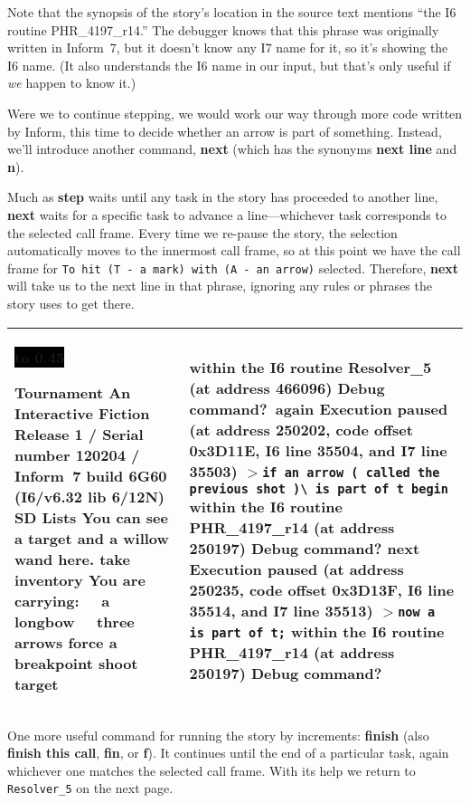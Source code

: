 \documentclass{book}
\newcommand{\n}{\hspace*{\fill}\newline}
\newcommand{\terp}[2]{\begin{center}\begin{tabular}{p{0.45\textwidth}|p{0.45\textwidth}}\midrule #1&#2\\\midrule\end{tabular}\end{center}}
\newcommand{\glkheading}[1]{\textbf{#1}}
\newcommand{\glkinput}[1]{\textbf{#1}}
\newcommand{\glkstatusline}[2]{\centerline{\colorbox{black}{\hbox to 0.45\textwidth{\textcolor{white}{#1\hfil #2}}}}}
\newcommand{\storyprompt}{\raisebox{1.5pt}{\(>\)}}
\newcommand{\cursor}{\raisebox{-1.5pt}{\RectangleThin}}
\newcommand{\markedindent}{\(>\)\qquad}
\begin{document}
Note that the synopsis of the story's location in the source text mentions ``the
I6 routine PHR\_4197\_r14.''  The debugger knows that this phrase was originally
written in Inform~7, but it doesn't know any I7 name for it, so it's showing the
I6 name.  (It also understands the I6 name in our input, but that's only useful
if \emph{we} happen to know it.)

Were we to continue stepping, we would work our way through more code written by
Inform, this time to decide whether an arrow is part of something.  Instead,
we'll introduce another command, \glkinput{next} (which has the synonyms
\glkinput{next line} and \glkinput{n}).

Much as \glkinput{step} waits until any task in the story has proceeded to
another line, \glkinput{next} waits for a specific task to advance a
line---whichever task corresponds to the selected call frame.  Every time we
re-pause the story, the selection automatically moves to the innermost call
frame, so at this point we have the call frame for
\lstinline{To hit (T - a mark)}\lstinline{ with (A - an arrow)} selected.
Therefore, \glkinput{next} will take us to the next line in that phrase,
ignoring any rules or phrases the story uses to get there.

\terp{\glkstatusline{Lists}{0/2}\n
  \glkheading{Tournament}\n
  An Interactive Fiction\n
  Release 1 / Serial number 120204 / Inform~7 build 6G60 (I6/v6.32 lib 6/12N) SD\n
  \n
  \glkheading{Lists}\n
  You can see a target and a willow wand here.\n
  \n
  \storyprompt\glkinput{take inventory}\n
  You are carrying:\n
  \null\ \ a longbow\n
  \null\ \ three arrows\n
  \n
  \storyprompt\glkinput{force a breakpoint}\n
  \storyprompt\glkinput{shoot target}}{%
  within the I6 routine Resolver\_5 (at address 466096)\n
  \n
  Debug command?\ \glkinput{again}\n
  \n
  Execution paused (at address 250202, code offset 0x3D11E, I6 line 35504, and I7 line 35503)\n
  \markedindent \lstinline{if an arrow ( called the previous shot )}\lstinline{\ is part of t begin}\n
  within the I6 routine PHR\_4197\_r14 (at address 250197)\n
  \n
  Debug command? \glkinput{next}\n
  \n
  Execution paused (at address 250235, code offset 0x3D13F, I6 line 35514, and I7 line 35513)\n
  \markedindent \lstinline{now a is part of t;}\n
  within the I6 routine PHR\_4197\_r14 (at address 250197)\n
  \n
  Debug command?\ \cursor}

One more useful command for running the story by increments: \glkinput{finish}
(also \glkinput{finish this call}, \glkinput{fin}, or \glkinput{f}).  It
continues until the end of a particular task, again whichever one matches the
selected call frame.  With its help we return to \lstinline{Resolver_5} on the
next page.
\end{document}
